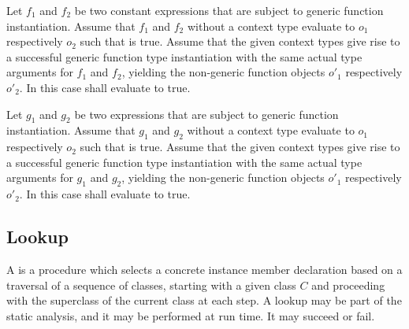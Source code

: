 \documentclass[makeidx]{article}
\begin{document}
{\LMHash{}%
Let $f_1$ and $f_2$ be two constant expressions that are subject to
generic function instantiation.
Assume that $f_1$ and $f_2$ without a context type evaluate to $o_1$
respectively $o_2$ such that  is true.
Assume that the given context types give rise to a successful
generic function type instantiation with
the same actual type arguments for $f_1$ and $f_2$,
yielding the non-generic function objects $o'_1$ respectively $o'_2$.
In this case  shall evaluate to true.


\LMHash{}%
Let $g_1$ and $g_2$ be two expressions
that are subject to generic function instantiation.
Assume that $g_1$ and $g_2$ without a context type evaluate to $o_1$
respectively $o_2$ such that  is true.
Assume that the given context types give rise to a successful
generic function type instantiation with
the same actual type arguments for $g_1$ and $g_2$,
yielding the non-generic function objects $o'_1$ respectively $o'_2$.
In this case  shall evaluate to true.




\subsection{Lookup}

\LMHash{}%
A  is a procedure which selects
a concrete instance member declaration based on a traversal of
a sequence of classes, starting with a given class $C$
and proceeding with the superclass of the current class at each step.
A lookup may be part of the static analysis, and it may be performed
at run time. It may succeed or fail.

}
\end{document}
